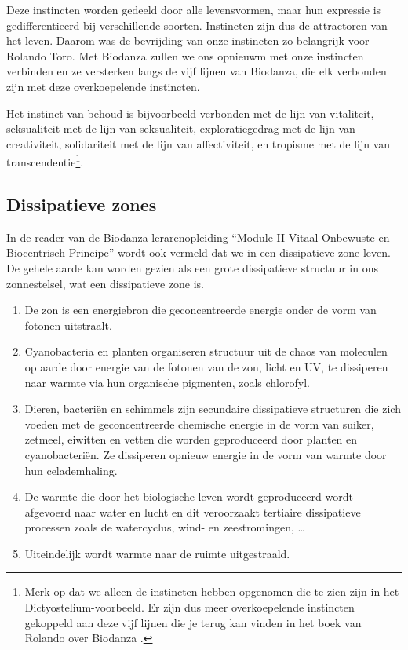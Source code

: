 \documentclass[
  11pt,
]{book}
\begin{document}
Deze instincten worden gedeeld door alle levensvormen, maar hun expressie is gedifferentieerd bij verschillende soorten. Instincten zijn dus de attractoren van het leven. Daarom was de bevrijding van onze instincten zo belangrijk voor Rolando Toro. Met Biodanza zullen we ons opnieuwm met onze instincten verbinden en ze versterken langs de vijf lijnen van Biodanza, die elk verbonden zijn met deze overkoepelende instincten.

Het instinct van behoud is bijvoorbeeld verbonden met de lijn van vitaliteit, seksualiteit met de lijn van seksualiteit, exploratiegedrag met de lijn van creativiteit, solidariteit met de lijn van affectiviteit, en tropisme met de lijn van transcendentie\footnote{Merk op dat we alleen de instincten hebben opgenomen die te zien zijn in het Dictyostelium-voorbeeld. Er zijn dus meer overkoepelende instincten gekoppeld aan deze vijf lijnen die je terug kan vinden in het boek van Rolando over Biodanza \citep{toro2008}.}.

\hypertarget{dissipatieve-zones}{%
\subsection{Dissipatieve zones}\label{dissipatieve-zones}}

In de reader van de Biodanza lerarenopleiding ``Module II Vitaal Onbewuste en Biocentrisch Principe'' wordt ook vermeld dat we in een dissipatieve zone leven. De gehele aarde kan worden gezien als een grote dissipatieve structuur in ons zonnestelsel, wat een dissipatieve zone is.

\begin{enumerate}
\def\labelenumi{\arabic{enumi}.}
\item
  De zon is een energiebron die geconcentreerde energie onder de vorm van fotonen uitstraalt.
\item
  Cyanobacteria en planten organiseren structuur uit de chaos van moleculen op aarde door energie van de fotonen van de zon, licht en UV, te dissiperen naar warmte via hun organische pigmenten, zoals chlorofyl.
\item
  Dieren, bacteriën en schimmels zijn secundaire dissipatieve structuren die zich voeden met de geconcentreerde chemische energie in de vorm van suiker, zetmeel, eiwitten en vetten die worden geproduceerd door planten en cyanobacteriën. Ze dissiperen opnieuw energie in de vorm van warmte door hun celademhaling.
\item
  De warmte die door het biologische leven wordt geproduceerd wordt afgevoerd naar water en lucht en dit veroorzaakt tertiaire dissipatieve processen zoals de watercyclus, wind- en zeestromingen, \ldots{}
\item
  Uiteindelijk wordt warmte naar de ruimte uitgestraald.
\end{enumerate}
\end{document}
